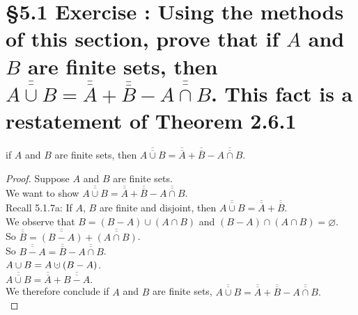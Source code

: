 \documentclass[a4paper,11pt]{article}
\newcommand{\cupdot}{\mathbin{\mathaccent\cdot\cup}}
\begin{document}
\section*{\S 5.1 Exercise : Using the methods of this section, prove that if \(A\) and \(B\) are finite sets, then \( \overline{\overline{A \cup B}} = \overline{\overline{A}} + \overline{\overline{B}} - \overline{\overline{A \cap B}}\). This fact is a restatement of Theorem 2.6.1}
\begin{theorem1}
if \(A\) and \(B\) are finite sets, then \( \overline{\overline{A \cup B}} = \overline{\overline{A}} + \overline{\overline{B}} - \overline{\overline{A \cap B}}\).
  \begin{proof}
Suppose \(A\) and \(B\) are finite sets.\\
We want to show \( \overline{\overline{A \cup B}} = \overline{\overline{A}} + \overline{\overline{B}} - \overline{\overline{A \cap 
B}}\).\\
Recall 5.1.7a: If \(A\), \(B\) are finite and disjoint, then \(\overline{\overline{A \cup B}} = \overline{\overline{A}} + 
\overline{\overline{B}}\).\\
We observe that \(B={(B - A)} \cup {(A \cap B)}\) and \({(B - A)} \cap {(A \cap B)} = 
\varnothing\).\\
So \(\overline{\overline{B}} = \overline{\overline{{(B -A)}}} + \overline{\overline{(A \cap 
B)}}\).\\
So \(\overline{\overline{B-A}}=\overline{\overline{B}} - \overline{\overline{A \cap 
B}}\).\\
\(A \cup B = A \cupdot {(B - A)}\).\\
\(\overline{\overline{A \cup B}} = \overline{\overline{A}} + \overline{\overline{B-A}}.\)\\
We therefore conclude if \(A\) and \(B\) are finite sets, \(\overline{\overline{A \cup B}} = \overline{\overline{A}} + \overline{\overline{B}} - \overline{\overline{A \cap 
B}}.\)\\
  \end{proof}
\end{theorem1}
\newpage
\setcounter{ProblemCounter}{8}
\end{document}
